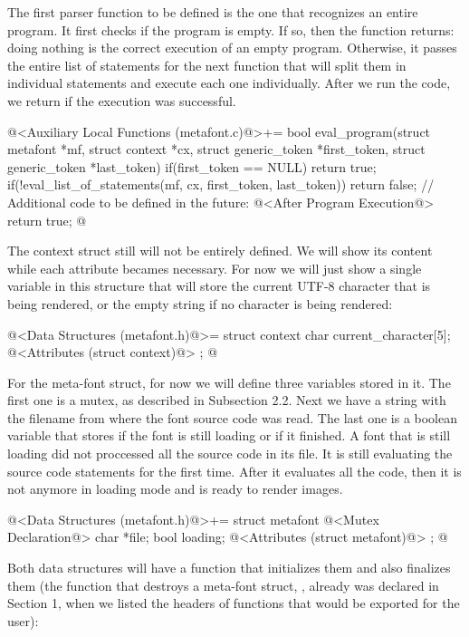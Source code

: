 The first parser function to be defined is the one that recognizes an
entire program. It first checks if the program is empty. If so, then
the function returns: doing nothing is the correct execution of an
empty program. Otherwise, it passes the entire list of statements for
the next function that will split them in individual statements and
execute each one individually. After we run the code, we return if the
execution was successful. 

\iniciocodigo
@<Auxiliary Local Functions (metafont.c)@>+=
bool eval_program(struct metafont *mf, struct context *cx,
                  struct generic_token *first_token,
                  struct generic_token *last_token){
  if(first_token == NULL)
    return true;
  if(!eval_list_of_statements(mf, cx, first_token, last_token))
    return false;
  // Additional code to be defined in the future:
  @<After Program Execution@>
  return true;
}
@
\fimcodigo

The context struct still will not be entirely defined. We will show
its content while each attribute becames necessary. For now we will
just show a single variable in this structure that will store the
current UTF-8 character that is being rendered, or the empty string
if no character is being rendered:

\iniciocodigo
@<Data Structures (metafont.h)@>=
struct context{
  char current_character[5];
  @<Attributes (struct context)@>
};
@
\fimcodigo

For the meta-font struct, for now we will define three variables
stored in it. The first one is a mutex, as described in Subsection
2.2. Next we have a string with the filename from where the font
source code was read. The last one is a boolean variable that stores if
the font is still loading or if it finished. A font that is still
loading did not proccessed all the source code in its file. It is
still evaluating the source code statements for the first time. After
it evaluates all the code, then it is not anymore in loading mode and
is ready to render images.

\iniciocodigo
@<Data Structures (metafont.h)@>+=
struct metafont{
  @<Mutex Declaration@>
  char *file;
  bool loading;
  @<Attributes (struct metafont)@>
};
@
\fimcodigo

Both data structures will have a function that initializes them and
also finalizes them (the function that destroys a meta-font
struct, , already was declared in
Section 1, when we listed the headers of functions that would be
exported for the user):

